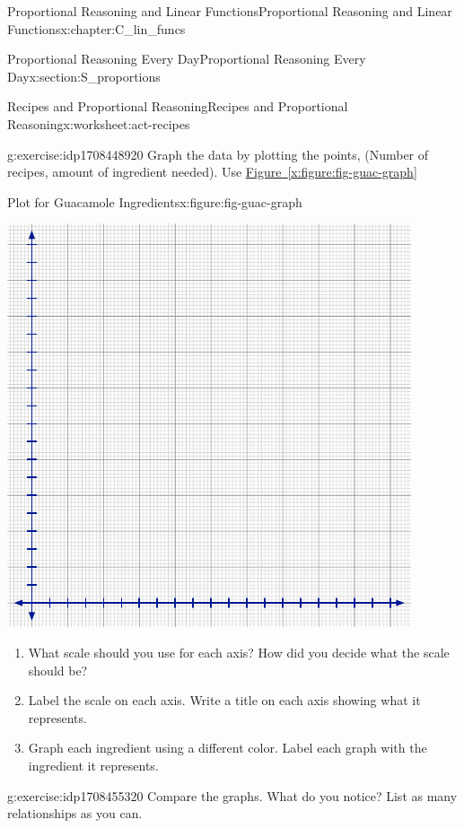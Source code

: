 \documentclass[oneside,10pt,]{book}
\newcommand{\xreffont}{\relax}
\numberwithin{equation}{chapter}
\begin{document}
\begin{chapterptx}{Proportional Reasoning and Linear Functions}{}{Proportional Reasoning and Linear Functions}{}{}{x:chapter:C_lin_funcs}
\begin{sectionptx}{Proportional Reasoning Every Day}{}{Proportional Reasoning Every Day}{}{}{x:section:S_proportions}
\begin{worksheet-subsection}{Recipes and Proportional Reasoning}{}{Recipes and Proportional Reasoning}{}{}{x:worksheet:act-recipes}
\begin{divisionexercise}{4}{}{}{g:exercise:idp1708448920}%
Graph the data by plotting the points, (Number of recipes, amount of ingredient needed). Use \hyperref[x:figure:fig-guac-graph]{Figure~{\xreffont\ref{x:figure:fig-guac-graph}}}%
\begin{figureptx}{Plot for Guacamole Ingredients}{x:figure:fig-guac-graph}{}%
\begin{image}{0.05}{0.9}{0.05}%
\includegraphics[width=\linewidth]{external/blank-graph.pdf}
\end{image}%
\tcblower
\end{figureptx}%
\begin{enumerate}[font=\bfseries,label=(\alph*),ref=\alph*]
\item{}What scale should you use for each axis? How did you decide what the scale should be?%
\item{}Label the scale on each axis. Write a title on each axis showing what it represents.%
\item{}Graph each ingredient using a different color. Label each graph with the ingredient it represents.%
\end{enumerate}
\end{divisionexercise}%
\begin{divisionexercise}{5}{}{}{g:exercise:idp1708455320}%
Compare the graphs. What do you notice? List as many relationships as you can.%

\end{divisionexercise}
\end{worksheet-subsection}
\end{sectionptx}
\end{chapterptx}
\end{document}
